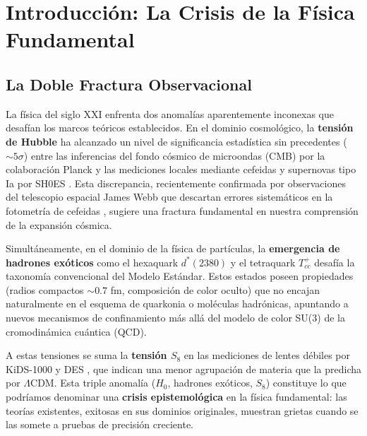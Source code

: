 \documentclass[11pt, a4paper]{article}
\theoremstyle{plain}
\theoremstyle{definition}
\begin{document}

\tableofcontents
\newpage


\section{Introducción: La Crisis de la Física Fundamental}
\label{sec:introduccion}

\subsection{La Doble Fractura Observacional}

La física del siglo XXI enfrenta dos anomalías aparentemente inconexas que desafían los marcos teóricos establecidos. En el dominio cosmológico, la \textbf{tensión de Hubble} ha alcanzado un nivel de significancia estadística sin precedentes ($\sim 5\sigma$) entre las inferencias del fondo cósmico de microondas (CMB) por la colaboración Planck \cite{Planck2018} y las mediciones locales mediante cefeidas y supernovas tipo Ia por SH0ES \cite{Riess2022}. Esta discrepancia, recientemente confirmada por observaciones del telescopio espacial James Webb que descartan errores sistemáticos en la fotometría de cefeidas \cite{Riess2024}, sugiere una fractura fundamental en nuestra comprensión de la expansión cósmica.

Simultáneamente, en el dominio de la física de partículas, la \textbf{emergencia de hadrones exóticos} como el hexaquark $d^*(2380)$ \cite{Bashkanov2024} y el tetraquark $T_{cc}^+$ \cite{Harada2025} desafía la taxonomía convencional del Modelo Estándar. Estos estados poseen propiedades (radios compactos $\sim 0.7$ fm, composición de color oculto) que no encajan naturalmente en el esquema de quarkonia o moléculas hadrónicas, apuntando a nuevos mecanismos de confinamiento más allá del modelo de color SU(3) de la cromodinámica cuántica (QCD).

A estas tensiones se suma la \textbf{tensión $S_8$} en las mediciones de lentes débiles por KiDS-1000 \cite{KiDS2021} y DES \cite{DES2022}, que indican una menor agrupación de materia que la predicha por $\Lambda$CDM. Esta triple anomalía ($H_0$, hadrones exóticos, $S_8$) constituye lo que podríamos denominar una \textbf{crisis epistemológica} en la física fundamental: las teorías existentes, exitosas en sus dominios originales, muestran grietas cuando se las somete a pruebas de precisión creciente.
\end{document}
